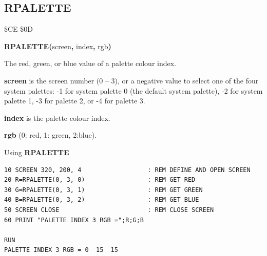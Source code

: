 
\newpage
\subsection{RPALETTE}
\begin{description}[leftmargin=2cm,style=nextline]
\item [Token:]    \$CE \$0D

\item [Format:]   {\bf RPALETTE(}screen{\bf,} index{\bf,} rgb{\bf)}

\item [Returns:]  The red, green, or blue value of a palette colour index.

                  {\bf screen} is the screen number (0 -- 3), or a negative value to select one of the four system palettes: -1 for system palette 0 (the default system palette), -2 for system palette 1, -3 for palette 2, or -4 for palette 3.

                  {\bf index} is the palette colour index.

                  {\bf rgb} (0: red, 1: green, 2:blue).

\item [Example:]  Using {\bf RPALETTE}

\begin{tcolorbox}[colback=black,coltext=white]
\verbatimfont{\codefont}
\begin{verbatim}
10 SCREEN 320, 200, 4                  : REM DEFINE AND OPEN SCREEN
20 R=RPALETTE(0, 3, 0)                 : REM GET RED
30 G=RPALETTE(0, 3, 1)                 : REM GET GREEN
40 B=RPALETTE(0, 3, 2)                 : REM GET BLUE
50 SCREEN CLOSE                        : REM CLOSE SCREEN
60 PRINT "PALETTE INDEX 3 RGB =";R;G;B

RUN
PALETTE INDEX 3 RGB = 0  15  15
\end{verbatim}
\end{tcolorbox}
\end{description}


\newpage
